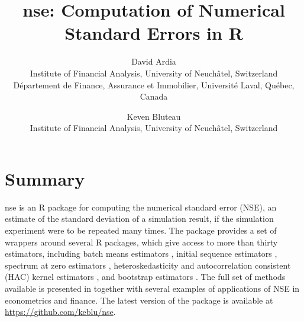 \documentclass[11pt]{article}
\begin{document}
\title{nse: Computation of Numerical Standard Errors in R}
\author{David Ardia\\
Institute of Financial Analysis, University of Neuch\^atel, Switzerland\\
D\'epartement de Finance, Assurance et Immobilier, Universit\'e Laval, Qu\'ebec, Canada
\and
Keven Bluteau\\
Institute of Financial Analysis, University of Neuch\^atel, Switzerland\\
}
	
\maketitle

\section*{Summary}

nse is an R package for computing the numerical standard error (NSE), an estimate of the
standard deviation of a simulation result, if the simulation experiment were to be repeated
many times. The package provides a set of wrappers around several R packages, which give access to more than thirty estimators, including 
batch means estimators \citep[][Section~3.2]{Geyer1992}, initial sequence estimators \citet[][Equation~3.3]{Geyer1992}, spectrum at zero estimators \citep{HeidelbergerWelch1981,FlegalJones2010}, heteroskedasticity and autocorrelation 
consistent (HAC) kernel estimators \citep{NeweyWest1987,Andrews1991,AndrewsMonahan1992,NeweyWest1994,Hirukawa2010}, and bootstrap estimators \citet{PolitisRomano1992,PolitisRomano1994,PolitisWhite2004}. 
The full set of methods available is 
presented in \citet{ArdiaEtAl2018} together with several examples of applications of NSE in econometrics and finance. The latest version of the package is available at \url{https://github.com/keblu/nse}.



	
\end{document}
